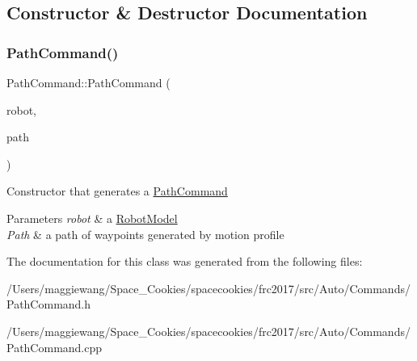 \subsection{Constructor \& Destructor Documentation}
\mbox{\label{class_path_command_af13590c26630833220671975f3d2ffa9}} 
\subsubsection{\texorpdfstring{Path\+Command()}{PathCommand()}}
{\footnotesize\ttfamily Path\+Command\+::\+Path\+Command (\begin{DoxyParamCaption}\item[{\hyperlink{class_robot_model}{Robot\+Model} $\ast$}]{robot,  }\item[{Path}]{path }\end{DoxyParamCaption})}

Constructor that generates a \hyperlink{class_path_command}{Path\+Command} 
\begin{DoxyParams}{Parameters}
{\em robot} & a \hyperlink{class_robot_model}{Robot\+Model} \\
\hline
{\em Path} & a path of waypoints generated by motion profile \\
\hline
\end{DoxyParams}


The documentation for this class was generated from the following files\+:\begin{DoxyCompactItemize}
\item 
/\+Users/maggiewang/\+Space\+\_\+\+Cookies/spacecookies/frc2017/src/\+Auto/\+Commands/Path\+Command.\+h\item 
/\+Users/maggiewang/\+Space\+\_\+\+Cookies/spacecookies/frc2017/src/\+Auto/\+Commands/Path\+Command.\+cpp\end{DoxyCompactItemize}
